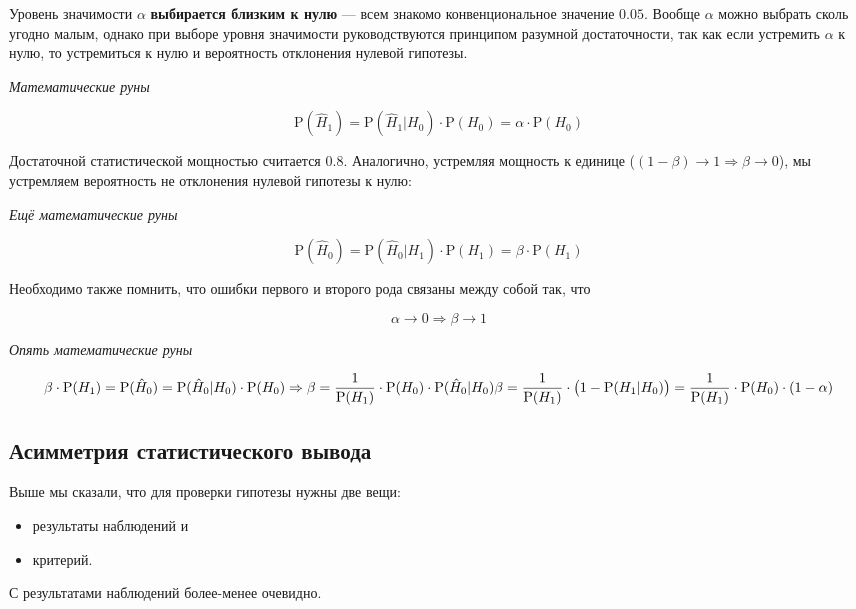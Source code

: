 \documentclass[
  letterpaper,
]{scrbook}
\providecommand{\tightlist}{%
  \setlength{\itemsep}{0pt}\setlength{\parskip}{0pt}}\usepackage{longtable,booktabs,array}
\theoremstyle{definition}
\theoremstyle{remark}
\begin{document}
Уровень значимости \(\alpha\) \textbf{выбирается близким к нулю} ---
всем знакомо конвенциональное значение \(0.05\). Вообще \(\alpha\) можно
выбрать сколь угодно малым, однако при выборе уровня значимости
руководствуются принципом разумной достаточности, так как если устремить
\(\alpha\) к нулю, то устремиться к нулю и вероятность отклонения
нулевой гипотезы.

\emph{Математические руны}

\[
\mathrm P (\hat H_1) = \mathrm P (\hat H_1 | H_0) \cdot \mathrm P (H_0) = \alpha \cdot \mathrm P(H_0)
\]

Достаточной статистической мощностью считается \(0.8\). Аналогично,
устремляя мощность к единице
(\((1 - \beta) \rightarrow 1 \Rightarrow \beta \rightarrow 0\)), мы
устремляем вероятность не отклонения нулевой гипотезы к нулю:

\emph{Ещё математические руны}

\[
\mathrm P (\hat H_0) = \mathrm P (\hat H_0 | H_1) \cdot \mathrm P (H_1) = \beta \cdot \mathrm P (H_1)
\]

Необходимо также помнить, что ошибки первого и второго рода связаны
между собой так, что

\[
\alpha \rightarrow 0 \Rightarrow \beta \rightarrow 1
\]

\emph{Опять математические руны}

\[
\beta \cdot \mathrm P (H_1) = \mathrm P (\hat H_0) = \mathrm P (\hat H_0 | H_0) \cdot \mathrm P (H_0) \Rightarrow \beta = \frac{1}{\mathrm P (H_1)} \cdot \mathrm P (H_0) \cdot \mathrm P(\hat H_0 | H_0) \\
\beta = \frac{1}{\mathrm P (H_1)} \cdot \big (1 - \mathrm P (H_1 | H_0)\big) = \frac{1}{\mathrm P (H_1)} \cdot \mathrm P (H_0) \cdot (1 - \alpha)
\]

\subsection{Асимметрия статистического
вывода}\label{stats-testing-asymmetry}

Выше мы сказали, что для проверки гипотезы нужны две вещи:

\begin{itemize}
\tightlist
\item
  результаты наблюдений и
\item
  критерий.
\end{itemize}

С результатами наблюдений более-менее очевидно.
\end{document}
